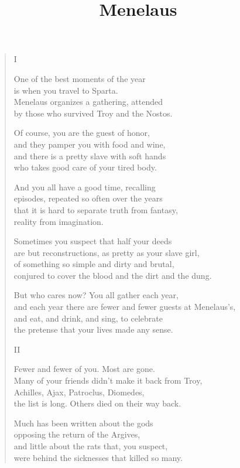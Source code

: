 \documentclass[11pt,a4paper]{article}
\title{Menelaus}
\author{}
\date{}
\begin{document}
\maketitle

\begin{verse}
I

One of the best moments of the year\\
is when you travel to Sparta.\\
Menelaus organizes a gathering, attended\\
by those who survived Troy and the Nostos.

Of course, you are the guest of honor,\\
and they pamper you with food and wine,\\
and there is a pretty slave with soft hands\\
who takes good care of your tired body.

And you all have a good time, recalling\\
episodes, repeated so often over the years\\
that it is hard to separate truth from fantasy,\\
reality from imagination.

Sometimes you suspect that half your deeds\\
are but reconstructions, as pretty as your slave girl,\\
of something so simple and dirty and brutal,\\
conjured to cover the blood and the dirt and the dung.

But who cares now? You all gather each year,\\
and each year there are fewer and fewer guests at Menelaus's,\\
and eat, and drink, and sing, to celebrate\\
the pretense that your lives made any sense.

II

Fewer and fewer of you. Most are gone.\\
Many of your friends didn't make it back from Troy,\\
Achilles, Ajax, Patroclus, Diomedes,\\
the list is long. Others died on their way back.

Much has been written about the gods\\
opposing the return of the Argives,\\
and little about the rats that, you suspect,\\
were behind the sicknesses that killed so many.


\end{verse}
\end{document}

